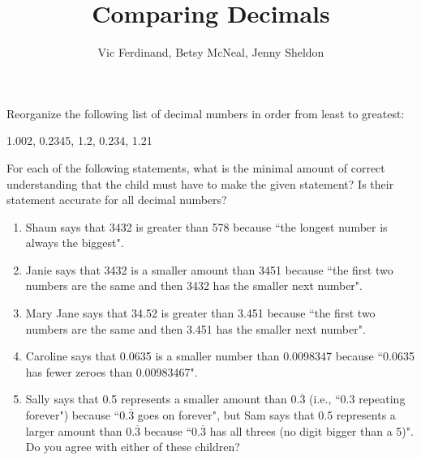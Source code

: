 \documentclass[nooutcomes]{ximera}
\title{Comparing Decimals}
\author{Vic Ferdinand, Betsy McNeal, Jenny Sheldon}
\begin{document}
\begin{abstract}\end{abstract}
\maketitle



\begin{problem}
 Reorganize the following list of decimal numbers in order from least to greatest:\\

\begin{center}
    1.002, 0.2345, 1.2,  0.234, 1.21
\end{center}

\end{problem}


\begin{problem}
For each of the following statements, what is the minimal amount of correct understanding that the child must have to make the given statement?  Is their statement accurate for all decimal numbers?
\begin{enumerate}
    

\item Shaun says that 3432 is greater than 578 because ``the longest number is always the biggest".

\vfill




\item Janie says that 3432 is a smaller amount than 3451 because ``the first two numbers are the same and then 3432 has the smaller next number".
\vfill

\item Mary Jane says that 34.52  is greater than 3.451 because ``the first two numbers are the same and then 3.451 has the smaller next number".
\vfill

\item Caroline says that 0.0635  is a smaller number than  0.0098347 because ``0.0635 has fewer zeroes than 0.00983467".
\vfill

\item Sally says that 0.5  represents a smaller amount than 0.$\overline{3}$  (i.e., ``0.3 repeating forever") because ``0.$\overline{3}$ goes on forever", but Sam says that 0.5 represents a larger amount than 0.$\overline{3}$ because ``0.$\overline{3}$ has all threes (no digit bigger than a 5)".  Do you agree with either of these children?
\vfill

\end{enumerate}

\end{problem}
\end{document}
